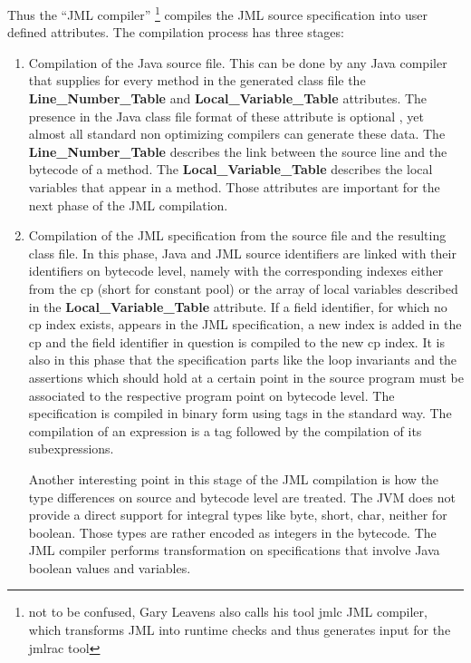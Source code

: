 Thus the ``JML compiler'' \footnote{not to be confused, Gary Leavens also calls his tool jmlc JML compiler, which transforms JML into runtime checks and thus generates input for the jmlrac tool  } compiles the JML source specification into user defined attributes. The compilation process has three stages:
\begin{enumerate}
\item Compilation of the Java source file. This can be done by any Java compiler that supplies for every method in the generated class file 
the \textbf{Line\_Number\_Table} and \textbf{Local\_Variable\_Table}  attributes. The presence in the Java class file format of 
these attribute is optional \cite{VMSpec}, yet almost all standard non optimizing compilers can generate these data. 
The \textbf{Line\_Number\_Table} describes the link between the source line and the bytecode of a method.  
The \textbf{Local\_Variable\_Table} describes the local variables that appear in a method. 
Those attributes are important for the next phase of the JML compilation.
\item Compilation of the JML specification from the source file and the resulting class file. In this phase, Java and JML source identifiers are 
linked with their identifiers on bytecode level, namely with the corresponding indexes either from the cp (short for constant pool) or the array of 
local variables described in the \textbf{Local\_Variable\_Table} attribute. If a field
identifier, for which no cp index exists, appears in the JML specification, a new index is added in the cp and the field identifier in question
is compiled to the new cp index. It is also in this phase that the specification parts like the loop invariants and the assertions which should hold at a certain point in the source program must be associated to the respective program point on bytecode level. The specification
is compiled in binary form using tags in the standard way. The compilation of an expression is a tag followed by the compilation of its subexpressions. 

Another interesting point in this stage of the JML compilation is how the type differences on source and bytecode level are treated. 
The JVM does not provide a direct support for integral types like byte, short, char, neither for boolean.
 Those types are rather encoded as integers in the bytecode. The JML compiler performs transformation on specifications that involve Java boolean values and variables.


\end{enumerate}
